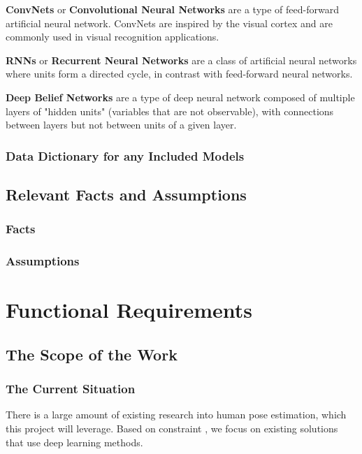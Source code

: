 \documentclass{scrreprt}
\begin{document}
\textbf{ConvNets} or \textbf{Convolutional Neural Networks} are a type of
feed-forward artificial neural network. ConvNets are inspired by the visual
cortex and are commonly used in visual recognition applications.

\textbf{RNNs} or \textbf{Recurrent Neural Networks} are a class of artificial
neural networks where units form a directed cycle, in contrast with
feed-forward neural networks.

\textbf{Deep Belief Networks} are a type of deep neural network composed of
multiple layers of "hidden units" (variables that are not observable), with
connections between layers but not between units of a given layer.

\subsection{Data Dictionary for any Included Models}

\section{Relevant Facts and Assumptions}

\subsection{Facts}

\subsection{Assumptions}

\chapter{Functional Requirements}

\section{The Scope of the Work}

\subsection{The Current Situation}

There is a large amount of existing research into human pose estimation, which
this project will leverage. Based on constraint
\theHumanPoseDeepLearningConstraint, we focus on existing solutions that use
deep learning methods.
\end{document}
